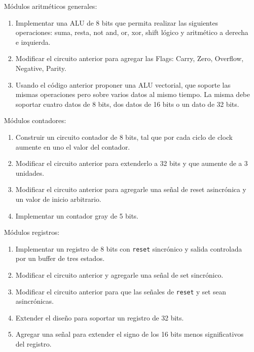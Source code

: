 \documentclass[a4paper,11pt]{article}
\begin{document}
\begin{exercise}%
\noindent Módulos aritméticos generales:
\begin{enumerate}
\item Implementar una ALU de 8 bits que permita realizar las siguientes operaciones: suma, resta, not and, or, xor, shift lógico y aritmético a derecha e izquierda.
\item Modificar el circuito anterior para agregar las Flags: Carry, Zero, Overflow, Negative, Parity.
\item Usando el código anterior proponer una ALU vectorial, que soporte las mismas operaciones pero sobre varios datos al mismo tiempo.
La misma debe soportar cuatro datos de 8 bits, dos datos de 16 bits o un dato de 32 bits.
\end{enumerate}
\end{exercise}

\newpage

\begin{exercise}%
\noindent Módulos contadores:
\begin{enumerate}
\item Construir un circuito contador de 8 bits, tal que por cada ciclo de clock aumente en uno el valor del contador.
\item Modificar el circuito anterior para extenderlo a 32 bits y que aumente de a 3 unidades.
\item Modificar el circuito anterior para agregarle una señal de reset asincrónica y un valor de inicio arbitrario.
\item Implementar un contador gray de 5 bits.
\end{enumerate}
\end{exercise}

\begin{exercise}%
\noindent Módulos registros:
\begin{enumerate}
\item Implementar un registro de 8 bits con \texttt{reset} sincrónico y salida controlada por un buffer de tres estados.
\item Modificar el circuito anterior y agregarle una señal de set sincrónico.
\item Modificar el circuito anterior para que las señales de \texttt{reset} y set sean asincrónicas.
\item Extender el diseño para soportar un registro de 32 bits.
\item Agregar una señal para extender el signo de los 16 bits menos significativos del registro.
\end{enumerate}
\end{exercise}
\end{document}
